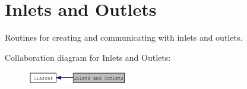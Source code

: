 \hypertarget{group__inout}{
\section{Inlets and Outlets}
\label{group__inout}
}


Routines for creating and communicating with inlets and outlets.  


Collaboration diagram for Inlets and Outlets:\nopagebreak
\begin{figure}[H]
\begin{center}
\leavevmode
\includegraphics[width=124pt]{group__inout}
\end{center}
\end{figure}
